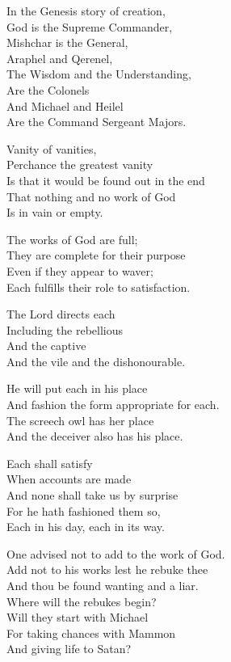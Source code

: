 \documentclass[
]{book}
\begin{document}
In the Genesis story of creation,\\
God is the Supreme Commander,\\
Mishchar is the General,\\
Araphel and Qerenel,\\
The Wisdom and the Understanding,\\
Are the Colonels\\
And Michael and Heilel\\
Are the Command Sergeant Majors.

Vanity of vanities,\\
Perchance the greatest vanity\\
Is that it would be found out in the end\\
That nothing and no work of God\\
Is in vain or empty.

The works of God are full;\\
They are complete for their purpose\\
Even if they appear to waver;\\
Each fulfills their role to satisfaction.

The Lord directs each\\
Including the rebellious\\
And the captive\\
And the vile and the dishonourable.

He will put each in his place\\
And fashion the form appropriate for each.\\
The screech owl has her place\\
And the deceiver also has his place.

Each shall satisfy\\
When accounts are made\\
And none shall take us by surprise\\
For he hath fashioned them so,\\
Each in his day, each in its way.

One advised not to add to the work of God.\\
Add not to his works lest he rebuke thee\\
And thou be found wanting and a liar.\\
Where will the rebukes begin?\\
Will they start with Michael\\
For taking chances with Mammon\\
And giving life to Satan?
\end{document}
